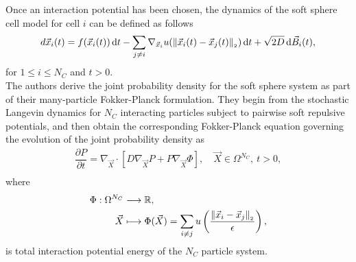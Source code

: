 Once an interaction potential has been chosen, the dynamics of the soft sphere cell model for cell $i$ can be defined as follows
\begin{align*}
	d\vec{x}_i(t) =  f(\vec{x}_i(t))\, \dequ t - \sum\limits_{j\neq i} \nabla_{\vec{x}_i} u (\norm[ \vec{x}_i(t) - \vec{x}_j(t)])\, \dequ t + \sqrt{2D} \, \dequ \vec{B}_i(t), 
\end{align*}
for $1 \leq i \leq N_C$ and $t>0$.  \\

The authors derive the joint probability density for the soft sphere system as part of their many-particle Fokker-Planck formulation.
They begin from the stochastic Langevin dynamics for $N_C$ interacting particles subject to pairwise soft repulsive potentials, and then obtain the corresponding Fokker-Planck equation governing the evolution of the joint probability density as 
\begin{align*}
	\dfrac{\partial P}{\partial t} = \nabla_{\vec{X}} \cdot [ D \nabla_{\vec{X}} P + P \nabla_{\vec{X}} \Phi], \quad \vec{X} \in \Omega^{N_C}, \: t > 0, \\
\end{align*}
where 
\begin{align*}
	\Phi: \Omega^{N_C} &\longrightarrow \R, \\
	\vec{X} &\longmapsto \Phi(\vec{X}) = \sum\limits_{i \neq j} u\left( \dfrac{\norm[\vec{x}_i - \vec{x}_j]}{\epsilon} \right), 
\end{align*}
is total interaction potential energy of the $N_C$ particle system. \\

